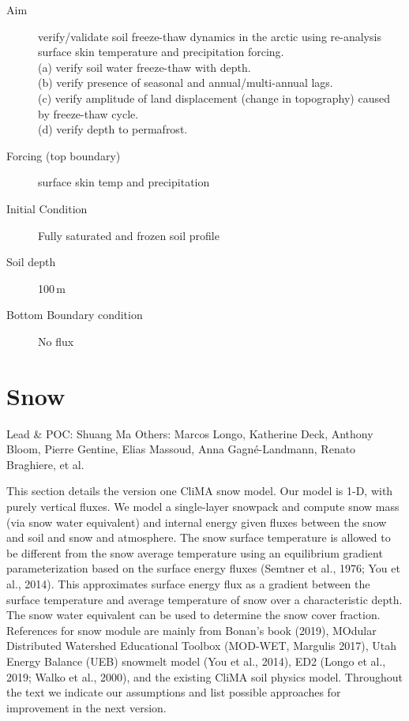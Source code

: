 \documentclass[twoside,10pt]{report}
\begin{document}
\begin{description}
\item [Aim] verify/validate soil freeze-thaw dynamics in the arctic using re-analysis surface skin temperature and precipitation forcing. \\
(a) verify soil water freeze-thaw with depth. \\
(b) verify presence of seasonal and annual/multi-annual lags. \\
(c) verify amplitude of land displacement (change in topography) caused by freeze-thaw cycle. \\
(d) verify depth to permafrost.
\item [Forcing (top boundary)] surface skin temp and precipitation
\item [Initial Condition] Fully saturated and frozen soil profile
\item [Soil depth] 100\,m
\item [Bottom Boundary condition] No flux
\end{description}

\chapter{Snow}
Lead \& POC: Shuang Ma
Others: Marcos Longo, Katherine Deck, Anthony Bloom, Pierre Gentine, Elias Massoud, Anna Gagné-Landmann, Renato Braghiere, et al.

This section details the version one CliMA snow model. Our model is 1-D, with purely vertical fluxes. We model a single-layer snowpack and compute snow mass (via snow water equivalent) and internal energy given fluxes between the snow and soil and snow and atmosphere. The snow surface temperature is allowed to be different from the snow average temperature using an equilibrium gradient parameterization based on the surface energy fluxes (Semtner et al., 1976; You et al., 2014). This approximates surface energy flux as a gradient between the surface temperature and average temperature of snow over a characteristic depth. The snow water equivalent can be used to determine the snow cover fraction. References for snow module are mainly from Bonan's book (2019), MOdular Distributed Watershed Educational Toolbox (MOD-WET, Margulis 2017),  Utah Energy Balance (UEB) snowmelt model (You et al., 2014), ED2 (Longo et al., 2019; Walko et al., 2000), and the existing CliMA soil physics model. Throughout the text we indicate our assumptions and list possible approaches for improvement in the next version.\\
\end{document}
